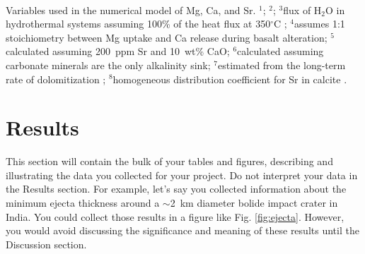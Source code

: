 \documentclass[11pt]{report}
\begin{document}
\begin{table}[h!]
$ $\\
\caption[Short title for this table that fits on a line]{\small{Variables used in the numerical model of Mg, Ca, and Sr. $^1$\citet{Meybeck2003a}; $^2$\citet{Allegre2010a}; $^3$flux of H$_2$O in hydrothermal systems assuming 100\% of the heat flux at 350$^{\circ}$C \citep{Elderfield1996a}; $^4$assumes 1:1 stoichiometry between Mg uptake and Ca release during basalt alteration; $^5$calculated assuming 200~ppm Sr and 10~wt\% CaO; $^6$calculated assuming carbonate minerals are the only alkalinity sink; $^7$estimated from the long-term rate of dolomitization \citep{Wilkinson1989a}; $^8$homogeneous distribution coefficient for Sr in calcite \citep{Mucci1983a}. \label{tab:sr}}}
\end{table}

\section{Results \label{sec:results}}
This section will contain the bulk of your tables and figures, describing and illustrating the data you collected for your project. Do not interpret your data in the Results section. For example, let's say you collected information about the minimum ejecta thickness around a $\sim$2~km diameter bolide impact crater in India. You could collect those results in a figure like Fig. \ref{fig:ejecta}. However, you would avoid discussing the significance and meaning of these results until the Discussion section.
\end{document}
